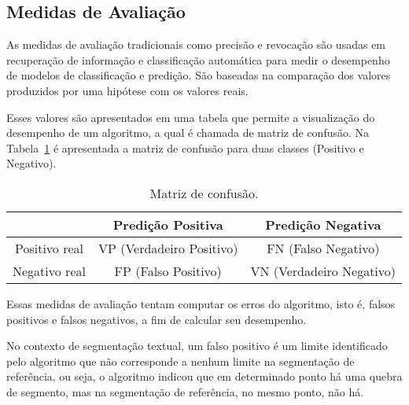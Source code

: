 \subsection{Medidas de Avaliação}

%
As medidas de avaliação tradicionais como precisão e revocação são usadas em recuperação de informação e classificação automática para medir o desempenho de modelos de classificação e predição. São baseadas na comparação dos valores produzidos por uma hipótese com os valores reais. 


%
Esses valores são apresentados em uma tabela que permite a visualização do desempenho de um algoritmo, a qual é chamada de matriz de confusão. Na Tabela~\ref{tab:matrizconfusao} é apresentada a matriz de confusão para duas classes (Positivo e Negativo).


\begin{table}[!h]
	\centering
	
	\begin{tabular}{|c|c|c|}
		\hline
		                & Predição Positiva         & Predição Negativa        \\ \hline
		Positivo real   & VP (Verdadeiro Positivo)  & FN (Falso Negativo)      \\ \hline
		Negativo real   & FP (Falso Positivo)       & VN (Verdadeiro Negativo) \\ \hline
	
	\end{tabular}
	
	\caption{Matriz de confusão.}
	\label{tab:matrizconfusao}

\end{table}


Essas medidas de avaliação tentam computar os erros do algoritmo, isto é, falsos positivos e falsos negativos, a fim de calcular seu desempenho. 

%
No contexto de segmentação textual, um falso positivo é um limite identificado pelo algoritmo que não corresponde a nenhum limite na segmentação de referência, ou seja, o algoritmo indicou que em determinado ponto há uma quebra de segmento, mas na segmentação de referência, no mesmo ponto, não há. 

